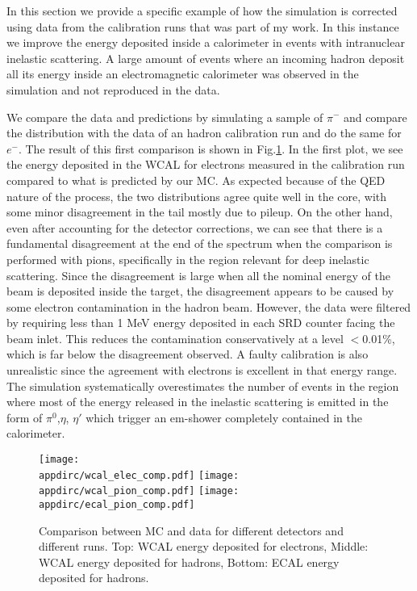 In this section we provide a specific example of how the simulation is corrected using data from the calibration runs that was part of my work. In this instance we improve the energy deposited inside a calorimeter in events with intranuclear inelastic scattering. A large amount of events where an incoming hadron deposit all its energy inside an electromagnetic calorimeter was observed in the simulation and not reproduced in the data.

We compare the data and predictions by simulating a sample of $\pi^-$ and compare the distribution with the data of an hadron calibration run and do the same for $e^-$. The result of this first comparison is shown in Fig.\ref{fig:ecal-comp}. In the first plot, we see the energy deposited in the WCAL for electrons measured in the calibration run compared to what is predicted by our MC. As expected because of the QED nature of the process, the two distributions agree quite well in the core, with some minor disagreement in the tail mostly due to pileup. On the other hand, even after accounting for the detector corrections, we can see that there is a fundamental disagreement at the end of the spectrum when the comparison is performed with pions, specifically in the region relevant for deep inelastic scattering. Since the disagreement is large when all the nominal energy of the beam is deposited inside the target, the disagreement appears to be caused by some electron contamination in the hadron beam. However, the data were filtered by requiring less than 1 MeV energy deposited in each SRD counter facing the beam inlet. This reduces the contamination conservatively at a level $<$0.01\%, which is far below the disagreement observed. A faulty calibration is also unrealistic since the agreement with electrons is excellent in that energy range. The simulation systematically overestimates the number of events in the region where most of the energy released in the inelastic scattering is emitted in the form of $\pi^0$,$\eta$, $\eta'$ which trigger an em-shower completely contained in the calorimeter.

\begin{figure}[bth!]
  \centering
  \texttt{[image: \\appdirc/wcal\_elec\_comp.pdf]}
  \texttt{[image: \\appdirc/wcal\_pion\_comp.pdf]}
  \texttt{[image: \\appdirc/ecal\_pion\_comp.pdf]}
  \caption[MC/DATA Comparison of $\pi^-$ in ECAL and WCAL]{Comparison between MC and data for different detectors and different runs. Top: WCAL energy deposited for electrons, Middle: WCAL energy deposited for hadrons, Bottom: ECAL energy deposited for hadrons.}
  \label{fig:ecal-comp}
\end{figure}

